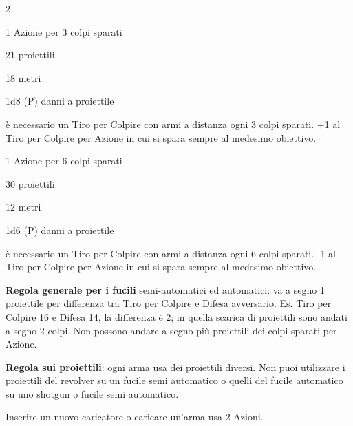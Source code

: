 \begin{multicols}{2}
\begin{description}[noitemsep, topsep=0pt, parsep=0pt, partopsep=0pt, leftmargin=0cm, labelwidth=2cm]
	\item[\textbf{Fucile Semi-automatico}]
	\item[\textbf{Azioni:}] 1 Azione per 3 colpi sparati
	\item[\textbf{Caricatore:}] 21 proiettili
	\item[\textbf{Gittata:}] 18 metri
	\item[\textbf{Danno:}] 1d8 (P) danni a proiettile
	\item[\textbf{Regole:}] è necessario un Tiro per Colpire con armi a distanza ogni 3 colpi sparati. +1 al Tiro per Colpire per Azione in cui si spara sempre al medesimo obiettivo.
\end{description}

\medskip

\begin{description}[noitemsep, topsep=0pt, parsep=0pt, partopsep=0pt, leftmargin=0cm, labelwidth=2cm]
	\item[\textbf{Fucile Automatico}]
	\item[\textbf{Azioni:}] 1 Azione per 6 colpi sparati
	\item[\textbf{Caricatore:}] 30 proiettili
	\item[\textbf{Gittata:}] 12 metri
	\item[\textbf{Danno:}] 1d6 (P) danni a proiettile
	\item[\textbf{Regole:}] è necessario un Tiro per Colpire con armi a distanza ogni 6 colpi sparati. -1 al Tiro per Colpire per Azione in cui si spara sempre al medesimo obiettivo.
\end{description}

\medskip

\textbf{Regola generale per i fucili} semi-automatici ed automatici: va a segno 1 proiettile per differenza tra Tiro per Colpire e Difesa avversario. Es. Tiro per Colpire 16 e Difesa 14, la differenza è 2; in quella scarica di proiettili sono andati a segno 2 colpi. Non possono andare a segno più proiettili dei colpi sparati per Azione.

\textbf{Regola sui proiettili}: ogni arma usa dei proiettili diversi. Non puoi utilizzare i proiettili del revolver su un fucile semi automatico o quelli del fucile automatico su uno shotgun o fucile semi automatico.

 Inserire un nuovo caricatore o caricare un'arma usa 2 Azioni.


\end{multicols}
